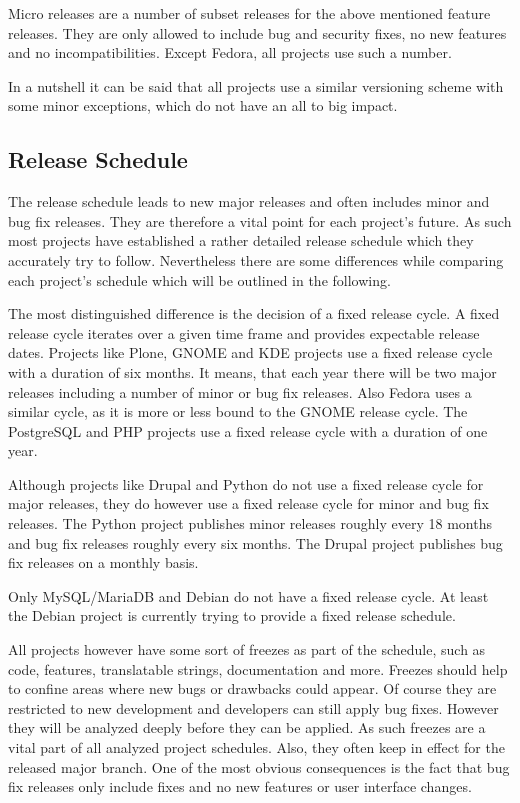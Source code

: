 Micro releases are a number of subset releases for the above mentioned feature
releases. They are only allowed to include bug and security fixes, no new
features and no incompatibilities. Except Fedora, all projects use such a
number.

In a nutshell it can be said that all projects use a similar versioning scheme
with some minor exceptions, which do not have an all to big impact.


\subsection{Release Schedule} %

The release schedule leads to new major releases and often includes minor and
bug fix releases. They are therefore a vital point for each project's future. As
such most projects have established a rather detailed release schedule which
they accurately try to follow. Nevertheless there are some differences while
comparing each project's schedule which will be outlined in the following.

The most distinguished difference is the decision of a fixed release cycle. A
fixed release cycle iterates over a given time frame and provides expectable
release dates. Projects like Plone, GNOME and KDE projects use a fixed release
cycle with a duration of six months. It means, that each year there will be two
major releases including a number of minor or bug fix releases. Also Fedora uses
a similar cycle, as it is more or less bound to the GNOME release cycle. The
PostgreSQL and PHP projects use a fixed release cycle with a duration of one
year.

Although projects like Drupal and Python do not use a fixed release cycle for
major releases, they do however use a fixed release cycle for minor and bug fix
releases. The Python project publishes minor releases roughly every 18 months
and bug fix releases roughly every six months. The Drupal project publishes
bug fix releases on a monthly basis.

Only MySQL/MariaDB and Debian do not have a fixed release cycle. At least the
Debian project is currently trying to provide a fixed release schedule.

All projects however have some sort of freezes as part of the schedule, such as
code, features, translatable strings, documentation and more. Freezes should
help to confine areas where new bugs or drawbacks could appear. Of course they
are restricted to new development and developers can still apply bug fixes.
However they will be analyzed deeply before they can be applied. As such
freezes are a vital part of all analyzed project schedules. Also, they often
keep in effect for the released major branch. One of the most obvious
consequences is the fact that bug fix releases only include fixes and no new
features or user interface changes.

